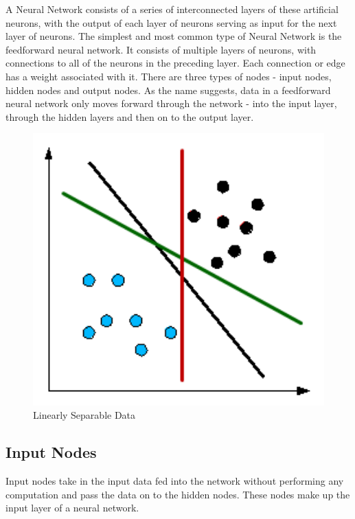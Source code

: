 \documentclass[12pt]{report}
\begin{document}
\begin{flushleft}
A Neural Network consists of a series of interconnected layers of these artificial neurons, with the output of each layer of neurons serving as input for the next layer of neurons. The simplest and most common type of Neural Network is the feedforward neural network. It consists of multiple layers of neurons, with connections to all of the neurons in the preceding layer. Each connection or edge has a weight associated with it. There are three types of nodes - input nodes, hidden nodes and output nodes. As the name suggests, data in a feedforward neural network only moves forward through the network - into the input layer, through the hidden layers and then on to the output layer.
\end{flushleft}

\vspace{0.5cm}
\begin{figure}[ht!]
	\centering
	\includegraphics[width=12cm]{linear}
	\caption{Linearly Separable Data}
	\label{fig:linear}
\end{figure}

\subsection{Input Nodes}
\begin{flushleft}
Input nodes take in the input data fed into the network without performing any computation and pass the data on to the hidden nodes. These nodes make up the input layer of a neural network.
\end{flushleft}
\end{document}
